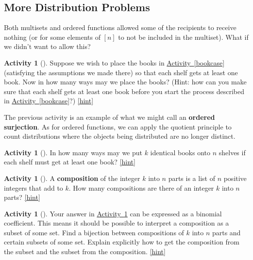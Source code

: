 \documentclass[10pt,]{book}
\newcommand{\terminology}[1]{\textbf{#1}}
\theoremstyle{plain}
\theoremstyle{definition}
\theoremstyle{definition}
\theoremstyle{definition}
\newtheorem{activity}[project]{Activity}
\numberwithin{equation}{chapter}
\begin{document}
\subsection[{More Distribution Problems}]{More Distribution Problems}\label{subsec-moredistributions}
\hypertarget{p-854}{}%
Both multisets and ordered functions allowed some of the recipients to receive nothing (or for some elements of \([n]\) to not be included in the multiset).  What if we didn't want to allow this?%
\begin{activity}[]\label{bookcaseeveryshelf}
\hypertarget{p-855}{}%
Suppose we wish to place the books in \hyperref[bookcase]{Activity~\ref{bookcase}} (satisfying the assumptions we made there) so that each shelf gets at least one book. Now in how many ways may we place the books? (Hint: how can you make sure that each shelf gets at least one book before you start the process described in \hyperref[bookcase]{Activity~\ref{bookcase}}?)%
\hfill{\tiny\hyperlink{a-126}{[hint]}\hypertarget{q-126}{}}\end{activity}
\hypertarget{p-858}{}%
The previous activity is an example of what we might call an \terminology{ordered surjection}.  As for ordered functions, we can apply the quotient principle to count distributions where the objects being distributed are no longer distinct.%
\begin{activity}[]\label{activity-120}
\hypertarget{p-859}{}%
In how many ways may we put \(k\) identical books onto \(n\) shelves if each shelf must get at least one book?%
\hfill{\tiny\hyperlink{a-127}{[hint]}\hypertarget{q-127}{}}\end{activity}
\begin{activity}[]\label{compositionagian}
\hypertarget{p-862}{}%
A \terminology{composition} of the integer \(k\) into \(n\) parts is a list of \(n\) positive integers that add to \(k\).  How many compositions are there of an integer \(k\) into \(n\) parts?%
\hfill{\tiny\hyperlink{a-128}{[hint]}\hypertarget{q-128}{}}\end{activity}
\begin{activity}[]\label{activity-122}
\hypertarget{p-865}{}%
Your answer in \hyperref[compositionagian]{Activity~\ref{compositionagian}} can be expressed as a binomial coefficient. This means it should be possible to interpret a composition as a subset of some set. Find a bijection between compositions of \(k\) into \(n\) parts and certain subsets of some set.  Explain explicitly how to get the composition from the subset and the subset from the composition.%
\hfill{\tiny\hyperlink{a-129}{[hint]}\hypertarget{q-129}{}}\end{activity}
\end{document}
